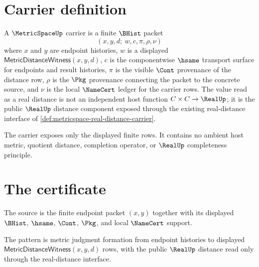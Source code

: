 \section{Carrier definition}

\begin{definition}
\label{def:metric-bhist-distance-carrier}
\label{def:metric-carrier}
A $\MetricSpaceUp$ carrier is a finite $\BHist$ packet
$$
(x,y,d;\ w,c,\pi,\rho,\nu)
$$
where $x$ and $y$ are endpoint histories, $w$ is a displayed
$\mathsf{MetricDistanceWitness}(x,y,d)$, $c$ is the componentwise $\hsame$
transport surface for endpoints and result histories, $\pi$ is the visible
$\Cont$ provenance of the distance row, $\rho$ is the $\Pkg$ provenance
connecting the packet to the concrete source, and $\nu$ is the local
$\NameCert$ ledger for the carrier rows. The value read as a real distance is
not an independent host function $C\times C\to\RealUp$; it is the public
$\RealUp$ distance component exposed through the existing real-distance
interface of \autoref{def:metricspace-real-distance-carrier}.

The carrier exposes only the displayed finite rows. It contains no ambient
host metric, quotient distance, completion operator, or $\RealUp$ completeness
principle.
\end{definition}

\section{The certificate}

\begin{definition}
\label{def:metric-source-specification}
The source is the finite endpoint packet $(x,y)$ together with its displayed
$\BHist$, $\hsame$, $\Cont$, $\Pkg$, and local $\NameCert$ support.
\end{definition}

\begin{definition}
\label{def:metric-pattern-specification}
The pattern is metric judgment formation from endpoint histories to displayed
$\mathsf{MetricDistanceWitness}(x,y,d)$ rows, with the public $\RealUp$
distance read only through the real-distance interface.
\end{definition}

